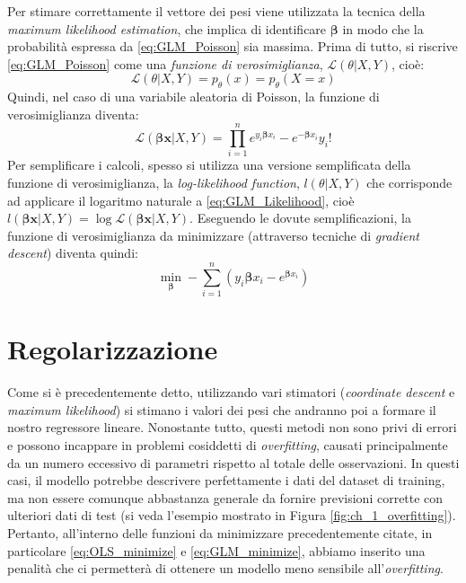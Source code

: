 Per stimare correttamente il vettore dei pesi viene utilizzata la tecnica della \textit{maximum likelihood 
estimation}, che implica di identificare $\bm{\beta}$ in modo che la probabilità espressa da \eqref{eq:GLM_Poisson} sia
massima. Prima di tutto, si riscrive \eqref{eq:GLM_Poisson} come una \textit{funzione di verosimiglianza}, $\mathcal{L}(\theta | X, Y)$, cioè:
\begin{equation}
\mathcal{L}(\theta | X, Y) = p_{\theta}(x) = p_{\theta}(X=x)
\end{equation}
Quindi, nel caso di una variabile aleatoria di Poisson, la funzione di verosimiglianza diventa:
\begin{equation}
\mathcal{L}(\bm{\beta x}  | X, Y ) = \prod_{i=1}^n {e^{y_i \bm{\beta} x_i}-e^{-\bm{\beta} x_i}}{y_i!} \label{eq:GLM_Likelihood}
\end{equation}
Per semplificare i calcoli, spesso si utilizza una versione semplificata della funzione di verosimiglianza, la \textit{log-likelihood function}, $l(\theta | X, Y)$ che corrisponde ad applicare il logaritmo naturale a \eqref{eq:GLM_Likelihood}, cioè 
$l(\bm{\beta x}  | X, Y) = \log{\mathcal{L}(\bm{\beta x}  | X, Y )}$. 
Eseguendo le dovute semplificazioni, la funzione di verosimiglianza da minimizzare (attraverso tecniche di \textit{gradient descent}) diventa quindi:
\begin{equation}
	\min_{\bm{\beta}} -\sum_{i=1}^n (y_i\bm{\beta} x_i - e^{\bm{\beta} x_i} ) \label{eq:GLM_minimize}
\end{equation} 

\section{Regolarizzazione}
\bigskip

Come si è precedentemente detto, utilizzando vari stimatori (\textit{coordinate descent} e \textit{maximum likelihood}) 
si stimano i valori dei pesi che andranno poi a formare il nostro regressore lineare. Nonostante tutto, questi metodi 
non sono privi di errori e possono incappare in problemi cosiddetti di \textit{overfitting}, causati principalmente da un 
numero eccessivo di parametri rispetto al totale delle osservazioni. In questi casi, il modello potrebbe descrivere 
perfettamente i dati del dataset di training, ma non essere comunque abbastanza generale da fornire previsioni corrette con 
ulteriori dati di test (si veda l'esempio mostrato in Figura \ref{fig:ch_1_overfitting}). 
Pertanto, all'interno delle funzioni da minimizzare precedentemente citate, in particolare \eqref{eq:OLS_minimize} e 
\eqref{eq:GLM_minimize}, abbiamo inserito una penalità che ci permetterà di ottenere un modello meno sensibile 
all'\textit{overfitting}. 
\bigskip 

